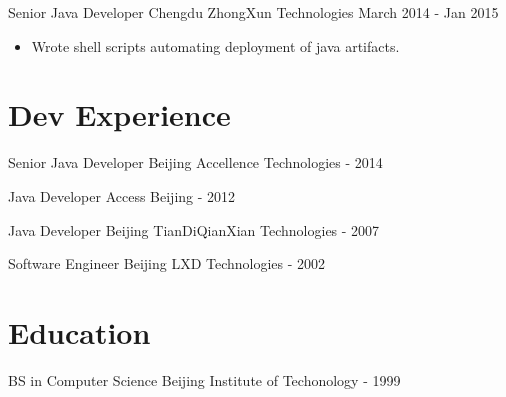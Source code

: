 \documentclass{resume}
\begin{document}
\vspace{3mm}
Senior Java Developer\newline
Chengdu ZhongXun Technologies\newline
March 2014 - Jan 2015
\begin{itemize}
  \item Wrote shell scripts automating deployment of java artifacts.
\end{itemize}

\section{Dev Experience}
Senior Java Developer\newline
Beijing Accellence Technologies - 2014\newline

Java Developer\newline
Access Beijing - 2012\newline

Java Developer\newline
Beijing TianDiQianXian Technologies - 2007\newline

Software Engineer\newline
Beijing LXD Technologies - 2002\newline

\section{Education}
BS in Computer Science\newline
Beijing Institute of Techonology - 1999\newline
\end{document}
